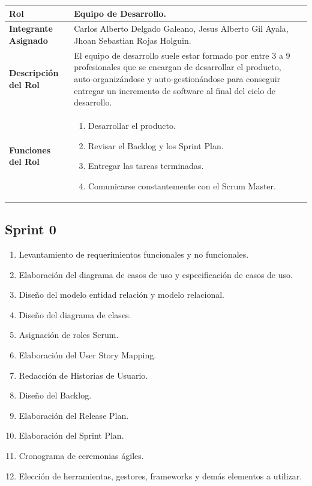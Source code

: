 \documentclass[12pt,a4paper]{article}
\begin{document}
\begin{center}
\begin{tabular}{|m{5cm}|m{9cm}|}
\hline
\textbf{Rol} & Equipo de Desarrollo. \\
\hline
\textbf{Integrante Asignado} & Carlos Alberto Delgado Galeano, Jesus Alberto Gil Ayala, Jhoan Sebastian Rojas Holguin. \\
\hline
\textbf{Descripción del Rol} & El equipo de desarrollo suele estar formado por entre 3 a 9 profesionales que se encargan de desarrollar el producto, auto-organizándose y auto-gestionándose para conseguir entregar un incremento de software al final del ciclo de desarrollo. \\
\hline
\textbf{Funciones del Rol} & \begin{enumerate}[noitemsep]
								 \item Desarrollar el producto.
								 \item Revisar el Backlog y los Sprint Plan.
								 \item Entregar las tareas terminadas.
								 \item Comunicarse constantemente con el Scrum Master.	
							\end{enumerate} \\
\hline
\end{tabular}
\vspace{5mm}


\end{center}
\newpage
\subsection{Sprint 0}
\begin{enumerate}
\item Levantamiento de requerimientos funcionales y no funcionales.
\item Elaboración del diagrama de casos de uso y especificación de casos de uso.
\item Diseño del modelo entidad relación y modelo relacional.
\item Diseño del diagrama de clases.
\item Asignación de roles Scrum.
\item Elaboración del User Story Mapping.
\item Redacción de Historias de Usuario.
\item Diseño del Backlog.
\item Elaboración del Release Plan.
\item Elaboración del Sprint Plan.
\item Cronograma de ceremonias ágiles.
\item Elección de herramientas, gestores, frameworks y demás elementos a utilizar.
\end{enumerate}
\end{document}
